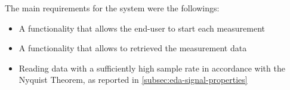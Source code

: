 The main requirements for the system were the followings:

\begin{itemize}
    \item A functionality that allows the end-user to start each measurement
    \item A functionality that allows to retrieved the measurement data
    \item Reading data with a sufficiently high sample rate in accordance with the Nyquist Theorem, as reported in \ref{subsec:eda-signal-properties}
\end{itemize}



